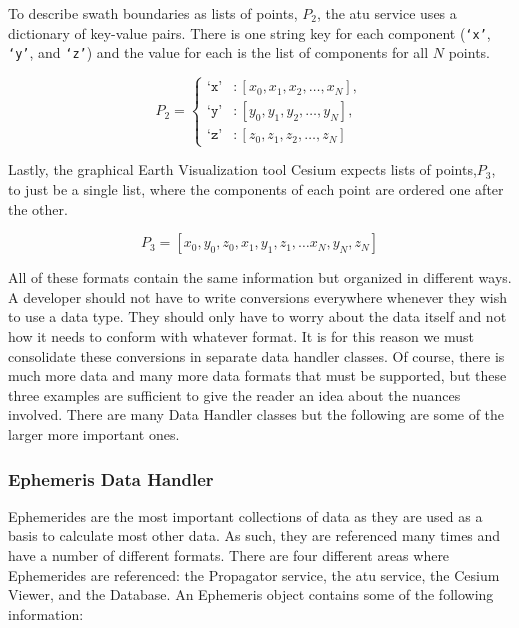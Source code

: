 To describe swath boundaries as lists of points, $P_2$, the \gls{atu} service
uses a dictionary of key-value pairs. There is one string key for each
component (\texttt{`x'}, \texttt{`y'}, and \texttt{`z'}) and the value for each
is the list of components for all $N$ points. 

\begin{equation*}
    P_2 = 
    \left\{
    \begin{aligned}
	\texttt{`x'}&: [x_0, x_1, x_2, \ldots, x_N],  \\
	\texttt{`y'}&: [y_0, y_1, y_2, \ldots, y_N],  \\
	\texttt{`z'}&: [z_0, z_1, z_2, \ldots, z_N]
    \end{aligned}
    \right.
\end{equation*}

Lastly, the graphical Earth Visualization tool Cesium expects lists of
points,$P_3$, to just be a single list, where the components of each point are
ordered one after the other.

\begin{equation*}
    P_3 = \left[ x_0, y_0, z_0, x_1, y_1, z_1, \ldots x_N, y_N, z_N \right]
\end{equation*}

All of these formats contain the same information but organized in different
ways.  A developer should not have to write conversions everywhere whenever
they wish to use a data type.  They should only have to worry about the data
itself and not how it needs to conform with whatever format. It is for this
reason we must consolidate these conversions in separate data handler classes.
Of course, there is much more data and many more data formats that must be
supported, but these three examples are sufficient to give the reader an idea
about the nuances involved. There are many Data Handler classes but the
following are some of the larger more important ones.


\subsubsection{Ephemeris Data Handler}

Ephemerides are the most important collections of data as they are used as a
basis to calculate most other data. As such, they are referenced many times and
have a number of different formats. There are four different areas where
Ephemerides are referenced: the Propagator service, the \gls{atu} service, the
Cesium Viewer, and the Database. An Ephemeris object contains some of the
following information:


